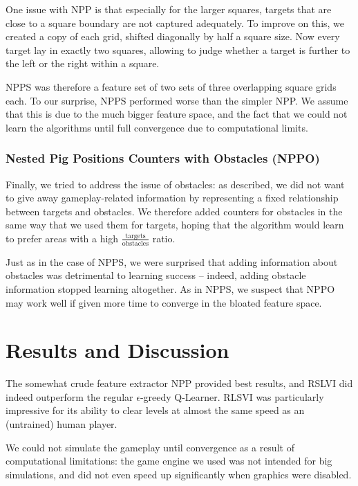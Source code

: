 \documentclass[fleqn,10pt]{SelfArx} %
\begin{document}
One issue with NPP is that especially for the larger squares, targets that are close to a square boundary are not captured adequately. To improve on this, we created a copy of each grid, shifted diagonally by half a square size. Now every target lay in exactly two squares, allowing to judge whether a target is further to the left or the right within a square.

NPPS was therefore a feature set of two sets of three overlapping square grids each. To our surprise, NPPS performed worse than the simpler NPP. We assume that this is due to the much bigger feature space, and the fact that we could not learn the algorithms until full convergence due to computational limits.

\subsubsection{Nested Pig Positions Counters with Obstacles (NPPO)}
 
Finally, we tried to address the issue of obstacles: as described, we did not want to give away gameplay-related information by representing a fixed relationship between targets and obstacles. We therefore added counters for obstacles in the same way that we used them for targets, hoping that the algorithm would learn to prefer areas with a high $\frac{\text{targets}}{\text{obstacles}}$ ratio. 

Just as in the case of NPPS, we were surprised that adding information about obstacles was detrimental to learning success -- indeed, adding obstacle information stopped learning altogether. As in NPPS, we suspect that NPPO may work well if given more time to converge in the bloated feature space.



\section{Results and Discussion}
The somewhat crude feature extractor NPP provided best results, and RSLVI did indeed outperform the regular $\epsilon$-greedy Q-Learner. RLSVI was particularly impressive for its ability to clear levels at almost the same speed as an (untrained) human player. 

We could not simulate the gameplay until convergence as a result of computational limitations: the game engine we used was not intended for big simulations, and did not even speed up significantly when graphics were disabled.
\end{document}
